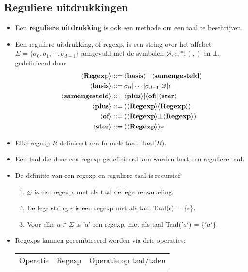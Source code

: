 \subsection{Reguliere uitdrukkingen}
\begin{itemize}
    \item Een \textbf{reguliere uitdrukking} is ook een methode om een taal te beschrijven.
    \item Een reguliere uitdrukking, of regexp, is een string over het alfabet $\Sigma = \{\sigma_0, \sigma_1, \cdots, \sigma_{d-1}\}$ aangevuld met de symbolen $\varnothing, \epsilon, *, (, )$ en $\bot$, gedefinieerd door
    \begin{align*}
        \langle \textbf{Regexp} \rangle &::= \langle \textbf{basis} \rangle\;|\;\langle \textbf{samengesteld} \rangle \\
        \langle \textbf{basis} \rangle &::= \sigma_0|\cdots|\sigma_{d-1}|\varnothing|\epsilon \\
        \langle \textbf{samengesteld} \rangle &::= \langle \textbf{plus} \rangle|\langle \textbf{of} \rangle|\langle \textbf{ster} \rangle\\
        \langle \textbf{plus} \rangle &::= (\langle \textbf{Regexp} \rangle\langle \textbf{Regexp} \rangle)\\
        \langle \textbf{of} \rangle &::= (\langle \textbf{Regexp} \rangle\bot\langle \textbf{Regexp} \rangle)\\
        \langle \textbf{ster} \rangle &::= (\langle \textbf{Regexp} \rangle)*
    \end{align*}
    \item Elke regexp $R$ definieert een formele taal, Taal($R$).
    \item Een taal die door een regexp gedefinieerd kan worden heet een reguliere taal.
    \item De definitie van een regexp en reguliere taal is recursief:
    \begin{enumerate}
        \item $\varnothing$ is een regexp, met als taal de lege verzameling.
        \item De lege string $\epsilon$ is een regexp met als taal Taal($\epsilon$) = \{$\epsilon$\}.
        \item  Voor elke $a \in \Sigma$ is 'a' een regexp, met als taal Taal($'a'$) = \{$'a'$\}.
    \end{enumerate}
    \item Regexps kunnen gecombineerd worden via drie operaties:
    \begin{table}[h]
        \centering
        \begin{tabular}{c c c}
            \hline
            Operatie & Regexp & Operatie op taal/talen \\

\end{tabular}
\end{table}
\end{itemize}
